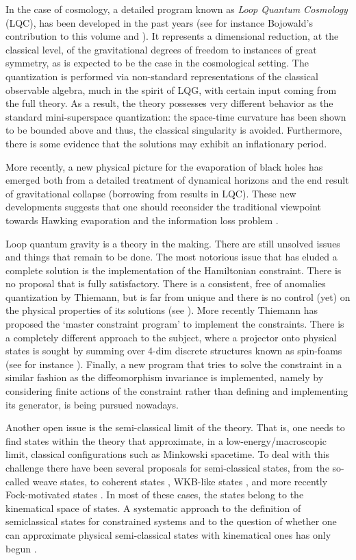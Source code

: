 \documentclass[aps,prd,tightenlines,showpacs,nofootinbib,preprint]{revtex4}
\begin{document}
In the case of cosmology, a detailed program known as {\it Loop
Quantum Cosmology} (LQC), has been developed in the past years
(see for instance Bojowald's contribution to this volume and
\cite{bojo}). It represents a dimensional reduction, at the
classical level, of the gravitational degrees of freedom to
instances of great symmetry, as is expected to be the case in the
cosmological setting. The quantization is performed via
non-standard representations of the classical observable algebra,
much in the spirit of LQG, with certain input coming from the full
theory. As a result, the theory possesses very different behavior
as the standard mini-superspace quantization: the space-time
curvature has been shown to be bounded above and thus, the
classical singularity is avoided. Furthermore, there is some
evidence that the solutions may exhibit an inflationary period.


More recently, a new physical picture for the evaporation of black
holes has emerged both from a detailed treatment of dynamical
horizons and the end result of gravitational collapse (borrowing
from results in LQC). These new developments suggests that one
should reconsider the traditional viewpoint towards Hawking
evaporation and the information loss problem \cite{AA:MB}.



Loop quantum gravity is a theory in the making. There are still
unsolved issues and things that remain to be done. The most
notorious issue that has eluded a complete solution is the
implementation of the Hamiltonian constraint. There is no proposal
that is fully satisfactory. There is a consistent, free of
anomalies quantization by Thiemann, but is far from unique and
there is no control (yet) on the physical properties of its
solutions (see \cite{Thiemann:2001yy}). More recently Thiemann has
proposed the `master constraint program' to implement the
constraints. There is a completely different approach to the
subject, where a projector onto physical states is sought by
summing over 4-dim discrete structures known as spin-foams (see
for instance \cite{Perez:2004hj}). Finally, a new program that
tries to solve the constraint in a similar fashion as the
diffeomorphism invariance is implemented, namely by considering
finite actions of the constraint rather than defining and
implementing its generator, is being pursued nowadays.

Another open issue is the semi-classical limit of the theory. That
is, one needs to find states within the theory that approximate,
in a low-energy/macroscopic limit, classical configurations such
as Minkowski spacetime. To deal with this challenge there have
been several proposals for semi-classical states, from the
so-called weave states, to coherent states \cite{Thiemann:2001yy},
WKB-like states \cite{Smolin:2004sx}, and more recently
Fock-motivated states \cite{AL:review}. In most of these cases,
the states belong to the kinematical space of states. A systematic
approach to the definition of semiclassical states for constrained
systems and to the question of whether one can approximate
physical semi-classical states with kinematical ones has only
begun \cite{ABC}.
\end{document}
